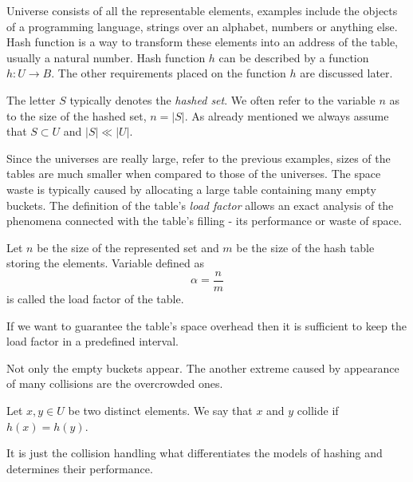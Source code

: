Universe consists of all the representable elements, examples include the objects of a programming language, strings over an alphabet, numbers or anything else. Hash function is a way to transform these elements into an address of the table, usually a natural number. Hash function $h$ can be described by a function $h: U \rightarrow B$. The other requirements placed on the function $h$ are discussed later.

The letter $S$ typically denotes the \emph{hashed set}. We often refer to the variable $n$ as to the size of the hashed set, $n = |S|$. As already mentioned we always assume that $S \subset U$ and $|S| \ll |U|$.

Since the universes are really large, refer to the previous examples, sizes of the tables are much smaller when compared to those of the universes. The space waste is typically caused by allocating a large table containing many empty buckets. The definition of the table's \emph{load factor} allows an exact analysis of the phenomena connected with the table's filling - its performance or waste of space.

\begin{definition}
\label{definition-load-factor}
Let $n$ be the size of the represented set and $m$ be the size of the hash table storing the elements. Variable defined as \[ \alpha = \frac{n}{m} \] is called the load factor of the table.
\end{definition}

If we want to guarantee the table's space overhead then it is sufficient to keep the load factor in a predefined interval.

Not only the empty buckets appear. The another extreme caused by appearance of many collisions are the overcrowded ones. 
\begin{definition}[Collision]
\label{definition-collision}
Let $x, y \in U$ be two distinct elements. We say that $x$ and $y$ collide if $h(x) = h(y)$.
\end{definition}

It is just the collision handling what differentiates the models of hashing and determines their performance.

